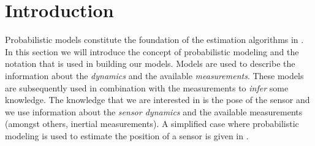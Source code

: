\section{Introduction}
\label{sec:models-probModeling}
Probabilistic models constitute the foundation of the estimation algorithms in . In this section we will introduce the concept of probabilistic modeling and the notation that is used in building our models. Models are used to describe the information about the \emph{dynamics} and the available \emph{measurements}. These models are subsequently used in combination with the measurements to \emph{infer} some knowledge. The knowledge that we are interested in is the pose of the sensor and we use information about the \emph{sensor dynamics} and the available measurements (amongst others, inertial measurements). A simplified case where probabilistic modeling is used to estimate the position of a sensor is given in .

